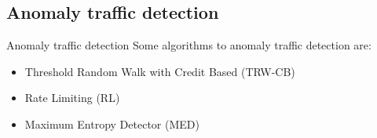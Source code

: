 \subsection{Anomaly traffic detection}
\begin{frame}{Anomaly traffic detection}
Some algorithms to anomaly traffic detection are:
\begin{itemize}
\item<2-> Threshold Random Walk with Credit Based (TRW-CB)
\item<3-> Rate Limiting (RL)
\item<4-> Maximum Entropy Detector (MED)
\end{itemize}
\end{frame}
